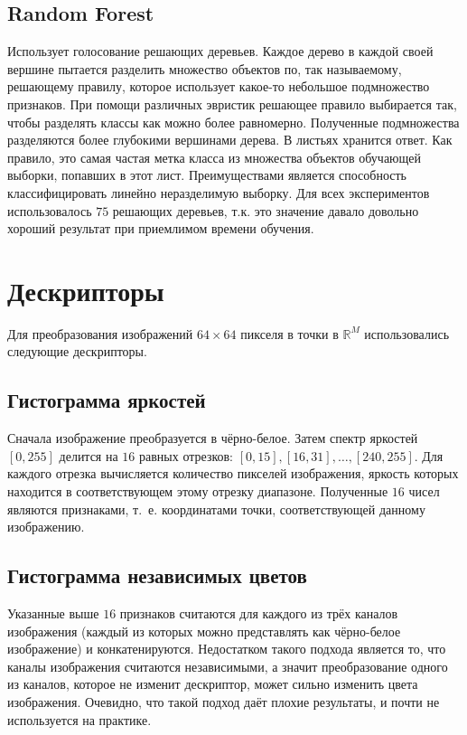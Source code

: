 \subsection{Random Forest}
Использует голосование решающих деревьев. Каждое дерево в каждой своей вершине
пытается разделить множество объектов по, так называемому, решающему правилу,
которое использует какое-то небольшое подмножество признаков. При помощи
различных эвристик решающее правило выбирается так, чтобы разделять классы как
можно более равномерно. Полученные подмножества разделяются более глубокими
вершинами дерева. В листьях хранится ответ. Как правило, это самая частая метка
класса из множества объектов обучающей выборки, попавших в этот лист.
Преимуществами является способность классифицировать линейно неразделимую
выборку. Для всех экспериментов использовалось $75$ решающих деревьев, т.к. это
значение давало довольно хороший результат при приемлимом времени обучения.


\section{Дескрипторы}
Для преобразования изображений $64 \times 64$ пикселя в точки в $\mathbb{R}^M$
использовались следующие дескрипторы.

\subsection{Гистограмма яркостей}
Сначала изображение преобразуется в чёрно-белое. Затем спектр яркостей
$[0, 255]$ делится на $16$ равных отрезков: $[0, 15], [16, 31], \ldots, [240,
255]$. Для каждого отрезка вычисляется количество пикселей изображения, яркость
которых находится в соответствующем этому отрезку диапазоне. Полученные $16$ чисел
являются признаками, т. е. координатами точки, соответствующей данному
изображению.

\subsection{Гистограмма независимых цветов}
Указанные выше $16$ признаков считаются для каждого из трёх каналов изображения
(каждый из которых можно представлять как чёрно-белое изображение) и
конкатенируются. Недостатком такого подхода является то, что каналы изображения
считаются независимыми, а значит преобразование одного из каналов, которое не
изменит дескриптор, может сильно изменить цвета изображения. Очевидно, что такой
подход даёт плохие результаты, и почти не используется на практике.

